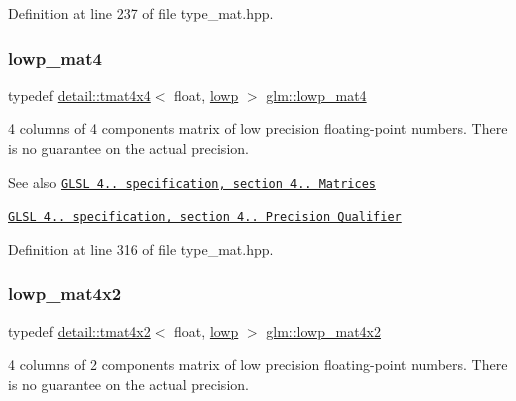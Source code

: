 Definition at line 237 of file type\+\_\+mat.\+hpp.

\mbox{\label{group__core__precision_ga8f6fef75ce51e9d6db7971478ad1f1c2}} 
\subsubsection{\texorpdfstring{lowp\+\_\+mat4}{lowp\_mat4}}
{\footnotesize\ttfamily typedef \hyperlink{structglm_1_1detail_1_1tmat4x4}{detail\+::tmat4x4}$<$ float, \hyperlink{namespaceglm_a0f04f086094c747d227af4425893f545ae161af3fc695e696ce3bf69f7332bc2d}{lowp} $>$ \hyperlink{group__core__precision_ga8f6fef75ce51e9d6db7971478ad1f1c2}{glm\+::lowp\+\_\+mat4}}

4 columns of 4 components matrix of low precision floating-\/point numbers. There is no guarantee on the actual precision.

\begin{DoxySeeAlso}{See also}
\href{http://www.opengl.org/registry/doc/GLSLangSpec.4.20.8.pdf}{\tt G\+L\+SL 4.. specification, section 4.. Matrices} 

\href{http://www.opengl.org/registry/doc/GLSLangSpec.4.20.8.pdf}{\tt G\+L\+SL 4.. specification, section 4.. Precision Qualifier} 
\end{DoxySeeAlso}


Definition at line 316 of file type\+\_\+mat.\+hpp.

\mbox{\label{group__core__precision_ga2cfe24ae14da17f3510acfc3d03e05a5}} 
\subsubsection{\texorpdfstring{lowp\+\_\+mat4x2}{lowp\_mat4x2}}
{\footnotesize\ttfamily typedef \hyperlink{structglm_1_1detail_1_1tmat4x2}{detail\+::tmat4x2}$<$ float, \hyperlink{namespaceglm_a0f04f086094c747d227af4425893f545ae161af3fc695e696ce3bf69f7332bc2d}{lowp} $>$ \hyperlink{group__core__precision_ga2cfe24ae14da17f3510acfc3d03e05a5}{glm\+::lowp\+\_\+mat4x2}}

4 columns of 2 components matrix of low precision floating-\/point numbers. There is no guarantee on the actual precision.

